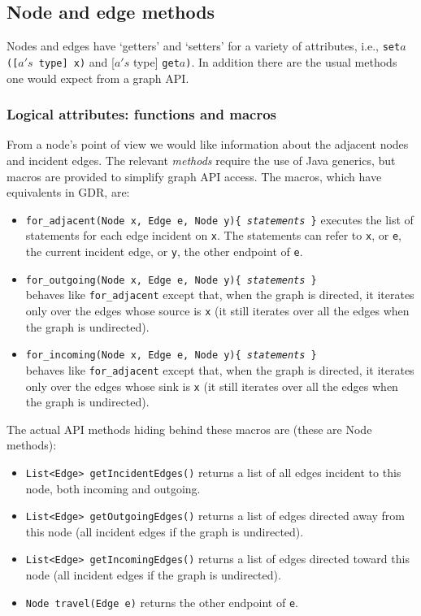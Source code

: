 \subsection{Node and edge methods}

Nodes and edges have `getters' and `setters' for
a variety of attributes, i.e.,
\texttt{set}$a$\texttt{([$a's$ type] x)} and [$a's$ type]
\texttt{get}$a$\texttt{)}.
In addition there are the usual methods one would expect from a graph API.

\subsubsection*{Logical attributes: functions and macros}

From a node's point of view we would like information about the adjacent nodes and incident edges.
The relevant \emph{methods} require the use of Java generics, but macros are provided
to simplify graph API access. The macros, which have equivalents in GDR, are:

\begin{itemize}

\item
\texttt{for\_adjacent(Node x, Edge e, Node y)\{ \emph{statements} \}}
executes the list of statements for each edge incident on \verb$x$.
The statements can refer to \verb$x$, or \verb$e$, the current incident edge,
or \verb$y$, the other endpoint of \verb$e$.

\item
\texttt{for\_outgoing(Node x, Edge e, Node y)\{ \emph{statements} \}}\\
behaves like \texttt{for\_adjacent} except that, when the graph is directed,
it iterates only over the edges whose source is \verb$x$ (it still iterates over all the edges when the graph is undirected). 

\item
\texttt{for\_incoming(Node x, Edge e, Node y)\{ \emph{statements} \}}\\
behaves like \texttt{for\_adjacent} except that, when the graph is directed,
it iterates only over the edges whose sink is \verb$x$ (it still iterates over all the edges when the graph is undirected). 

\end{itemize}

The actual API methods hiding behind these macros are (these are Node methods):

\begin{itemize}
\item
\texttt{List<Edge>~getIncidentEdges()} returns a list of all edges incident to this node,
both incoming and outgoing.
\item
\texttt{List<Edge>~getOutgoingEdges()} returns a list of edges directed away
from this node (all incident edges if the graph is undirected).
\item
\texttt{List<Edge>~getIncomingEdges()} returns a list of edges directed toward
this node (all incident edges if the graph is undirected).
\item
\texttt{Node~travel(Edge~e)} returns the other endpoint of \texttt{e}.
\end{itemize}

